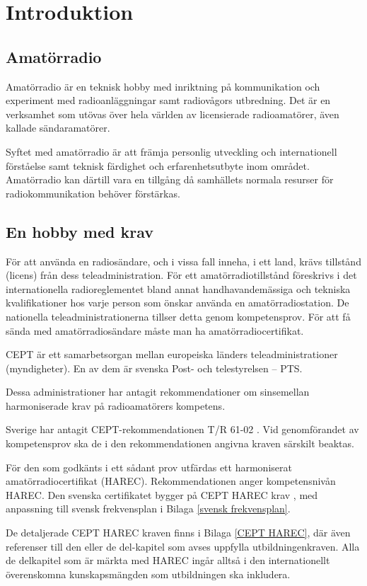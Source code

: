 \chapter*{Introduktion}
\section*{Amatörradio}
Amatörradio är en teknisk hobby med inriktning på kommunikation och experiment
med radioanläggningar samt radiovågors utbredning. Det är en verksamhet som
utövas över hela världen av licensierade radioamatörer, även kallade
sändaramatörer.

Syftet med amatörradio är att främja personlig utveckling och internationell
förståelse samt teknisk färdighet och erfarenhetsutbyte inom området.
Amatörradio kan därtill vara en tillgång då samhällets normala resurser för
radiokommunikation behöver förstärkas.

\section*{En hobby med krav}

För att använda en radiosändare, och i vissa fall inneha, i ett land, krävs
tillstånd (licens) från dess teleadministration.
För ett amatörradiotillstånd föreskrivs i det internationella radioreglementet
\cite{ITU-RR} bland annat handhavandemässiga och tekniska kvalifikationer hos
varje person som önskar använda en amatörradiostation.
De nationella teleadministrationerna tillser detta genom kompetensprov.
För att få sända med amatörradiosändare måste man ha amatörradiocertifikat.

CEPT är ett samarbetsorgan mellan europeiska länders teleadministrationer
(myndigheter).
En av dem är svenska Post- och telestyrelsen -- PTS.

Dessa administrationer har antagit rekommendationer om sinsemellan
harmoniserade krav på radioamatörers kompetens.

Sverige har antagit CEPT-rekommendationen T/R 61-02 \cite{TR6102}.
Vid genomförandet av kompetensprov ska de i den rekommendationen
angivna kraven särskilt beaktas.

För den som godkänts i ett sådant prov utfärdas ett harmoniserat
amatörradiocertifikat (HAREC).
Rekommendationen anger kompetensnivån HAREC.
Den svenska certifikatet bygger på CEPT HAREC krav \cite{TR6102},
med anpassning till svensk frekvensplan i Bilaga \ref{svensk frekvensplan}.

De detaljerade CEPT HAREC kraven finns i Bilaga \ref{CEPT HAREC}, där även
referenser till den eller de del-kapitel som avses uppfylla utbildningenkraven.
Alla de delkapitel som är märkta med HAREC ingår alltså i den internationellt
överenskomna kunskapsmängden som utbildningen ska inkludera.

